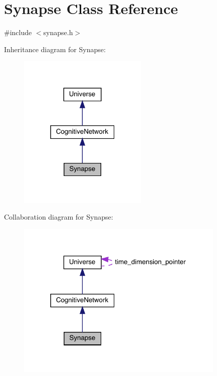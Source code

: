 \hypertarget{class_synapse}{}\section{Synapse Class Reference}
\label{class_synapse}


{\ttfamily \#include $<$synapse.\+h$>$}



Inheritance diagram for Synapse\+:\nopagebreak
\begin{figure}[H]
\begin{center}
\leavevmode
\includegraphics[width=175pt]{class_synapse__inherit__graph}
\end{center}
\end{figure}


Collaboration diagram for Synapse\+:
\nopagebreak
\begin{figure}[H]
\begin{center}
\leavevmode
\includegraphics[width=283pt]{class_synapse__coll__graph}
\end{center}
\end{figure}
